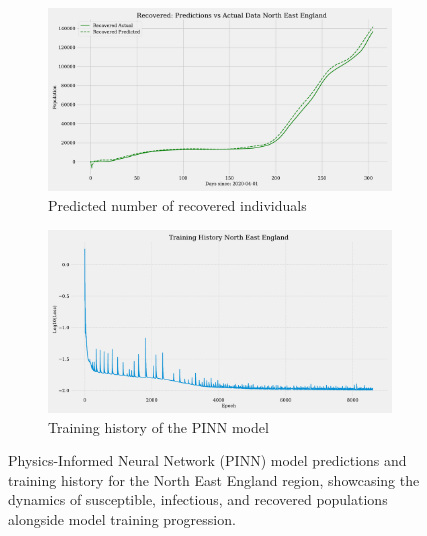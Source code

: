 \documentclass[12pt]{article}
\begin{document}
\begin{figure}
    \begin{subfigure}[t]{0.45\textwidth}
        \includegraphics[width=\textwidth]{images/pinn/R_predictions_North East England.pdf}
        \caption{Predicted number of recovered individuals}
        \label{fig:R_predictions_North East England}
    \end{subfigure}
    \hfill %
    \begin{subfigure}[t]{0.45\textwidth}
        \centering
        \includegraphics[width=\textwidth]{images/pinn/Training_History_North East England.pdf}
        \caption{Training history of the PINN model}
        \label{fig:Training_History_North East England}
    \end{subfigure}
    \caption{Physics-Informed Neural Network (PINN) model predictions and training history for the North East England region, showcasing the dynamics of susceptible, infectious, and recovered populations alongside model training progression.}
    \label{fig:PINN_North East England_Comprehensive}
\end{figure}
\end{document}
